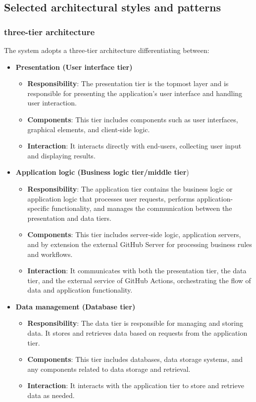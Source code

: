 \subsection{Selected architectural styles and patterns}  

\subsubsection{three-tier architecture}
The system adopts a three-tier architecture differentiating between: 
\begin{itemize}
    \item \textbf{Presentation (User interface tier)}
    \begin{itemize}
        \item \textbf{Responsibility}: The presentation tier is the topmost layer and is responsible for presenting the application's user interface and handling user interaction.
        \item \textbf{Components}: This tier includes components such as user interfaces, graphical elements, and client-side logic.
        \item \textbf{Interaction}: It interacts directly with end-users, collecting user input and displaying results.
    \end{itemize}
    \item \textbf{Application logic (Business logic tier/middle tier})
    \begin{itemize}
        \item \textbf{Responsibility}: The application tier contains the business logic or application logic that processes user requests, performs application-specific functionality, and manages the communication between the presentation and data tiers.
        \item \textbf{Components}: This tier includes server-side logic, application servers, and by extension the external GitHub Server for processing business rules and workflows.
        \item \textbf{Interaction}: It communicates with both the presentation tier, the data tier, and the external service of GitHub Actions, orchestrating the flow of data and application functionality. 
    \end{itemize}
\item \textbf{Data management (Database tier)}
    \begin{itemize}
        \item \textbf{Responsibility}: The data tier is responsible for managing and storing data. It stores and retrieves data based on requests from the application tier.
        \item \textbf{Components}: This tier includes databases, data storage systems, and any components related to data storage and retrieval.
         \item \textbf{Interaction}: It interacts with the application tier to store and retrieve data as needed.
    \end{itemize}
\end{itemize}

